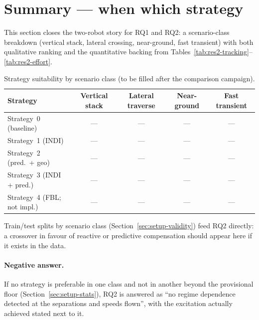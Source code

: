 \section{Summary --- when which strategy}
\label{sec:res2-summary}

This section closes the two-robot story for RQ1 and RQ2: a scenario-class breakdown (vertical stack,
lateral crossing, near-ground, fast transient) with both qualitative ranking and the quantitative
backing from Tables~\ref{tab:res2-tracking}--\ref{tab:res2-effort}.


\begin{table}[t]
  \centering
  \caption{Strategy suitability by scenario class (to be filled after the comparison campaign).}
  \label{tab:res2-when-which}
  \small
  \begin{tabular}{@{}lcccc@{}}
    \toprule
    Strategy & Vertical stack & Lateral traverse & Near-ground & Fast transient \\
    \midrule
    Strategy~0 (baseline) & --- & --- & --- & --- \\
    Strategy~1 (INDI) & --- & --- & --- & --- \\
    Strategy~2 (pred.\ + geo) & --- & --- & --- & --- \\
    Strategy~3 (INDI + pred.) & --- & --- & --- & --- \\
    Strategy~4 (FBL; not impl.) & --- & --- & --- & --- \\
    \bottomrule
  \end{tabular}
\end{table}

Train/test splits by scenario class (Section~\ref{sec:setup-validity}) feed RQ2 directly: a crossover
in favour of reactive or predictive compensation should appear here if it exists in the data.
\paragraph{Negative answer.} If no strategy is preferable in one class and not in another beyond the
provisional floor (Section~\ref{sec:setup-stats}), RQ2 is answered as ``no regime dependence detected at the separations and
speeds flown'', with the excitation actually achieved stated next to it.
